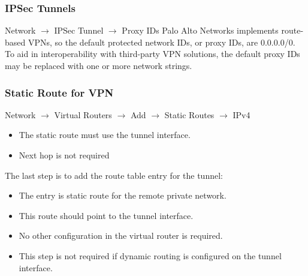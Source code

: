 \subsubsection{IPSec Tunnels}
Network $\rightarrow$ IPSec Tunnel $\rightarrow$ Proxy IDs
\newline
Palo Alto Networks implements route-based VPNs, so the default protected network IDs, or proxy IDs, are 0.0.0.0/0.
To aid in interoperability with third-party VPN solutions, the default proxy IDs may be replaced with one or more network strings.

\subsubsection{Static Route for VPN}
Network $\rightarrow$ Virtual Routers $\rightarrow$ Add $\rightarrow$ Static Routes $\rightarrow$ IPv4
\begin{itemize}
    \item The static route must use the tunnel interface.
    \item Next hop is not required
\end{itemize}
The last step is to add the route table entry for the tunnel:
\begin{itemize}
    \item The entry is static route for the remote private network.
    \item This route should point to the tunnel interface.
    \item No other configuration in the virtual router is required.
    \item This step is not required if dynamic routing is configured on the tunnel interface.
\end{itemize}


